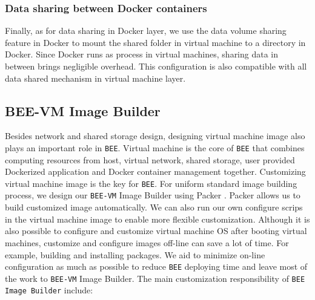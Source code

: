 \subsubsection{Data sharing between Docker containers}
Finally, as for data sharing in Docker layer, we use the data volume sharing feature in Docker to mount the shared folder in virtual machine to a directory in Docker. Since Docker runs as process in virtual machines, sharing data in between brings negligible overhead. This configuration is also compatible with all data shared mechanism in virtual machine layer.

\subsection{BEE-VM Image Builder}
Besides network and shared storage design, designing virtual machine image also plays an important role in \texttt{BEE}. Virtual machine is the core of \texttt{BEE} that combines computing resources from host, virtual network, shared storage, user provided Dockerized application and Docker container management together. Customizing virtual machine image is the key for \texttt{BEE}. For uniform standard image building process, we design our \texttt{BEE-VM} Image Builder using Packer \cite{packer}. Packer allows us to build customized image automatically. We can also run our own configure scrips in the virtual machine image to enable more flexible customization. Although it is also possible to configure and customize virtual machine OS after booting virtual machines, customize and configure images off-line can save a lot of time. For example, building and installing packages. We aid to minimize on-line configuration as much as possible to reduce \texttt{BEE} deploying time and leave most of the work to \texttt{BEE-VM} Image Builder. The main customization responsibility of \texttt{BEE Image Builder} include:
